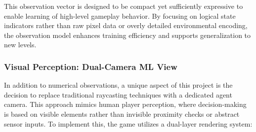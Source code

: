 \documentclass[12pt,oneside,openright,a4paper]{cpe-english-project}
\begin{document}
This observation vector is designed to be compact yet sufficiently expressive to enable learning of high-level gameplay behavior. By focusing on logical state indicators rather than raw pixel data or overly detailed environmental encoding, the observation model enhances training efficiency and supports generalization to new levels.

\subsubsection{Visual Perception: Dual-Camera ML View}

In addition to numerical observations, a unique aspect of this project is the decision to replace traditional raycasting techniques with a dedicated agent camera. This approach mimics human player perception, where decision-making is based on visible elements rather than invisible proximity checks or abstract sensor inputs.
To implement this, the game utilizes a dual-layer rendering system:
\end{document}
